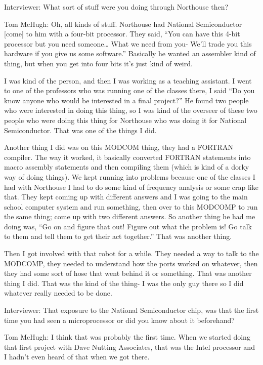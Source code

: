 \textcolor{interviewer}{Interviewer:} What sort of stuff were you doing through Northouse then?

\textcolor{interviewee}{Tom McHugh:} Oh, all kinds of stuff. Northouse had National Semiconductor [come] to him with a four-bit processor. They said, “You can have this 4-bit processor but you need someone… What we need from you- We’ll trade you this hardware if you give us some software.” Basically he wanted an assembler kind of thing, but when you get into four bits it’s just kind of weird. 

I was kind of the person, and then I was working as a teaching assistant. I went to one of the professors who was running one of the classes there, I said “Do you know anyone who would be interested in a final project?” He found two people who were interested in doing this thing, so I was kind of the overseer of these two people who were doing this thing for Northouse who was doing it for National Semiconductor. That was one of the things I did.

Another thing I did was on this MODCOM thing, they had a FORTRAN compiler. The way it worked, it basically converted FORTRAN statements into macro assembly statements and then compiling them (which is kind of a dorky way of doing things). We kept running into problems because one of the classes I had with Northouse I had to do some kind of frequency analysis or some crap like that. They kept coming up with different answers and I was going to the main school computer system and run something, then over to this MODCOMP to run the same thing; come up with two different answers. So another thing he had me doing was, “Go on and figure that out! Figure out what the problem is! Go talk to them and tell them to get their act together.” That was another thing.

Then I got involved with that robot for a while. They needed a way to talk to the MODCOMP, they needed to understand how the ports worked on whatever, then they had some sort of hose that went behind it or something. That was another thing I did. That was the kind of the thing- I was the only guy there so I did whatever really needed to be done.

\textcolor{interviewer}{Interviewer:} That exposure to the National Semiconductor chip, was that the first time you had seen a microprocessor or did you know about it beforehand?

\textcolor{interviewee}{Tom McHugh:} I think that was probably the first time. When we started doing that first project with Dave Nutting Associates, that was the Intel processor and I hadn’t even heard of that when we got there.

